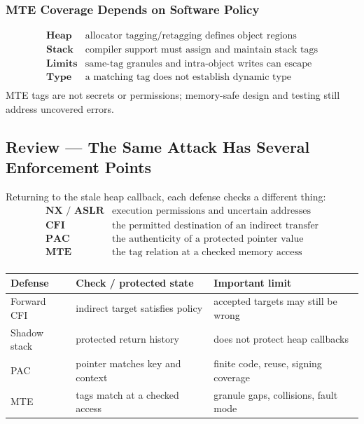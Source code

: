 \documentclass[hidelinks]{article}
\begin{document}
\subsubsection{MTE Coverage Depends on Software Policy}

\[
\begin{array}{ll}
\textbf{Heap}  & \text{allocator tagging/retagging defines object regions}\\
\textbf{Stack} & \text{compiler support must assign and maintain stack tags}\\
\textbf{Limits}& \text{same-tag granules and intra-object writes can escape}\\
\textbf{Type}  & \text{a matching tag does not establish dynamic type}\\
\end{array}
\]
MTE tags are not secrets or permissions; memory-safe design and testing still address uncovered errors.

\subsection{Review --- The Same Attack Has Several Enforcement Points}

Returning to the stale heap callback, each defense checks a different thing:
\[
\begin{array}{ll}
\textbf{NX / ASLR} & \text{execution permissions and uncertain addresses}\\
\textbf{CFI}       & \text{the permitted destination of an indirect transfer}\\
\textbf{PAC}       & \text{the authenticity of a protected pointer value}\\
\textbf{MTE}       & \text{the tag relation at a checked memory access}\\
\end{array}
\]

\begin{center}
\color{white}
\begin{tabular}{p{2.6cm}p{5.0cm}p{5.0cm}}
\hline
\textbf{Defense} & \textbf{Check / protected state} & \textbf{Important limit}\\ \hline
Forward CFI  & indirect target satisfies policy & accepted targets may still be wrong\\
Shadow stack & protected return history & does not protect heap callbacks\\
PAC          & pointer matches key and context & finite code, reuse, signing coverage\\
MTE          & tags match at a checked access & granule gaps, collisions, fault mode\\ \hline
\end{tabular}
\end{center}
\end{document}
